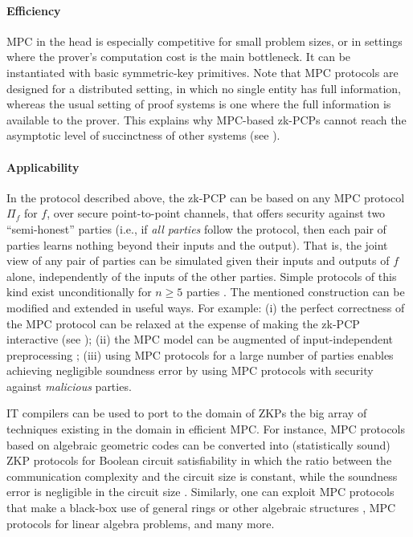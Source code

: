 \paragraph{Efficiency}
MPC in the head is especially competitive for small problem sizes, or in settings where the prover's computation cost is the main bottleneck.
It can be instantiated with basic symmetric-key primitives.
Note that MPC protocols are designed for a distributed setting, in which no single entity has full information, whereas the usual setting of proof systems is one where the full information is available to the prover.
This explains why MPC-based zk-PCPs cannot reach the asymptotic level of succinctness of other systems (see ).



\paragraph{Applicability}
In the protocol described above, the zk-PCP can be based on any MPC protocol $\Pi_f$ for $f$, over secure point-to-point channels, that offers security against two ``semi-honest'' parties (i.e., if {\em all parties} follow the protocol, then each pair of parties learns nothing beyond their inputs and the output). 
That is, the joint view of any pair of parties can be simulated given their inputs and outputs of $f$ alone, independently of the inputs of the other parties.
Simple protocols of this kind exist unconditionally for $n\ge 5$ parties
\cite{1988:BGW,1988:CCD,2006:Mau:CC:SMPC-made-simple}.
The mentioned construction can be modified and extended in useful ways. 
For example:
(i) the perfect correctness of the MPC protocol can be relaxed at the expense of making the zk-PCP interactive (see );
(ii) the MPC model can be augmented  of input-independent preprocessing \cite{2018:KKW:improved-NIZK};
(iii) using MPC protocols for a large number of parties enables achieving negligible soundness error by using MPC protocols with security against {\em malicious} parties.
\loosen 


IT compilers can be used to port to the domain of ZKPs the big array of techniques existing in the domain in efficient MPC.
For instance, MPC protocols based on algebraic geometric codes
\cite{2006:CC:algebraic-geometric-SSS-and-SMPC-over-small-fields}
can be converted into (statistically sound) ZKP protocols for Boolean circuit satisfiability in which the ratio between the communication complexity and the circuit size is constant, while the soundness error is negligible in the circuit size \cite{2009:IKOS:ZKPs-from-SMPC}.
Similarly, one can exploit MPC protocols that make a black-box use of general
rings \cite{2003:CFIK:efficient-MPC-over-rings} or 
other algebraic structures \cite{2013:CDIMRR:efficient-MP-via-LD-threshold-formulae}, 
MPC protocols for linear algebra \cite{2001:CD:secure-distributed-linear-algebra} problems, and many more. 
\loosen


